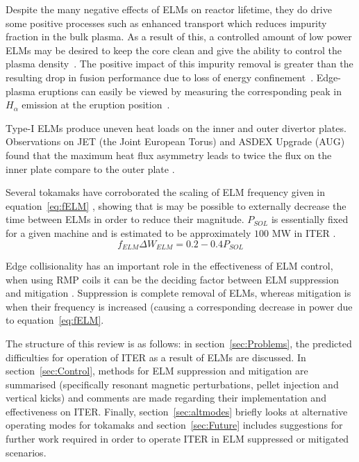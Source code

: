 \documentclass[11pt, twocolumn]{article}  %
\newcommand{\citep}[1]{\cite{#1}}
\begin{document}
Despite the many negative effects of ELMs on reactor lifetime, they do drive some positive processes such as enhanced transport which reduces impurity fraction in the bulk plasma. As a result of this, a controlled amount of low power ELMs may be desired to keep the core clean and give the ability to control the plasma density~\citep{Hill1997}. The positive impact of this impurity removal is greater than the resulting drop in fusion performance due to loss of energy confinement~\cite{Connor2008}. Edge-plasma eruptions can easily be viewed by measuring the corresponding peak in $H_{\alpha}$ emission at the eruption position~\citep{Hill1997}.

Type-I ELMs produce uneven heat loads on the inner and outer divertor plates. Observations on JET (the Joint European Torus) and ASDEX Upgrade (AUG) found that the maximum heat flux asymmetry leads to twice the flux on the inner plate compare to the outer plate \cite{Eich2007}.

Several tokamaks have corroborated the scaling of ELM frequency given in equation~\ref{eq:fELM} \cite{Leonard1999, Loarte2002}, showing that is may be possible to externally decrease the time between ELMs in order to reduce their magnitude. $P_{SOL}$ is essentially fixed for a given machine and is estimated to be approximately $100$ MW in ITER \cite{Eich2013}.
\begin{equation}\label{eq:fELM}
f_{ELM}\Delta W_{ELM} = 0.2-0.4 P_{SOL}
\end{equation}

Edge collisionality has an important role in the effectiveness of ELM control, when using RMP coils it can be the deciding factor between ELM suppression and mitigation \cite{Kirk2013}. Suppression is complete removal of ELMs, whereas mitigation is when their frequency is increased (causing a corresponding decrease in power due to equation~\ref{eq:fELM}.

The structure of this review is as follows: in section~\ref{sec:Problems}, the predicted difficulties for operation of ITER as a result of ELMs are discussed. In section~\ref{sec:Control}, methods for ELM suppression and mitigation are summarised (specifically resonant magnetic perturbations, pellet injection and vertical kicks) and comments are made regarding their implementation and effectiveness on ITER. Finally, section~\ref{sec:altmodes} briefly looks at alternative operating modes for tokamaks and section~\ref{sec:Future} includes suggestions for further work required in order to operate ITER in ELM suppressed or mitigated scenarios.
\end{document}
